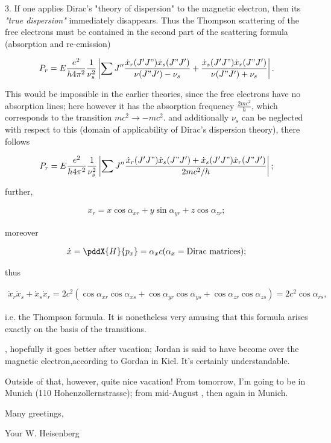 \documentclass{article}
\newcommand{\uequ}[1]{
\begin{align*}
#1
\end{align*}
}
\begin{document}
3. If one applies Dirac's "theory of dispersion" to the magnetic electron, then its \textit{"true dispersion"} immediately disappears. Thus the Thompson scattering of the free electrons must be contained in the second part of the scattering formula (absorption and re-emission)

\uequ{
P_r = E\frac{e^2}{h 4\pi^2}\frac{1}{\nu_s^2}\left|\sum{J''}
\frac{\dot{x}_r(J'J")\dot{x}_s(J"J')}{\nu(J"J') - \nu_s} + 
\frac{\dot{x}_s(J'J")\dot{x}_r(J"J')}{\nu(J"J') + \nu_s}
\right|.
}

This would be impossible in the earlier theories, since the free electrons have no absorption lines; here however it has the absorption frequency $\frac{2mc^2}{h}$, which corresponds to the transition $mc^2 \to -mc^2$.  and additionally $\nu_s$ can be neglected with respect to this (domain of applicability of Dirac's dispersion theory), there follows
\uequ{
P_r = E\frac{e^2}{h 4\pi^2}\frac{1}{\nu_s^2}\left|\sum{J''}
\frac{\dot{x}_r(J'J")\dot{x}_s(J"J') + \dot{x}_s(J'J")\dot{x}_r(J"J')}{2mc^2 / h}
\right|;
}
further,
\uequ{
x_r = x\cos{\alpha_{xr}} + y\sin{\alpha_{yr}} + z\cos{\alpha_{zr}};
}
moreover
\uequ{
\dot{x} = \pddX{H}{p_x} = \alpha_x c (\alpha_x = \text{Dirac matrices});
}
thus
\uequ{
\dot{x}_r \dot{x}_s + \dot{x}_s \dot{x}_r = 2c^2(
\cos{\alpha_{xr}}\cos{\alpha_{xs}} +
\cos{\alpha_{yr}}\cos{\alpha_{ys}} +
\cos{\alpha_{zr}}\cos{\alpha_{zs}}
) = 2c^2 \cos{\alpha_{rs}},
}
i.e. the Thompson formula. It is nonetheless very amusing that this formula arises exactly on the basis of the  transitions.

, hopefully it goes better after vacation; Jordan is said to have become  over the magnetic electron,according to Gordan in Kiel. It's certainly understandable.

Outside of that, however, quite nice vacation! From tomorrow, I'm going to be in Munich (110 Hohenzollernstrasse); from mid-August , then again in Munich.

Many greetings,

Your W. Heisenberg
\end{document}
